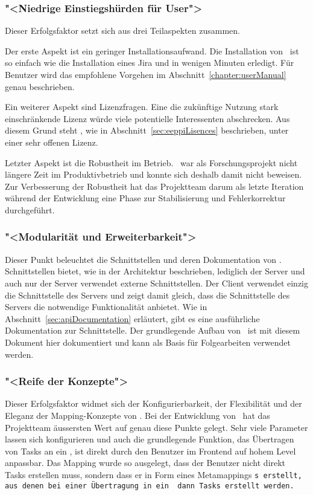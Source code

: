 		
		\subsubsection{"<Niedrige Einstiegshürden für User">}
			Dieser Erfolgsfaktor setzt sich aus drei Teilaspekten zusammen.
			
			Der erste Aspekt ist ein geringer Installationsaufwand.
			Die Installation von \eeppi\ ist so einfach wie  die Installation eines Jira und in wenigen Minuten erledigt. 
			Für Benutzer wird das empfohlene Vorgehen im Abschnitt~\ref{chapter:userManual} genau beschrieben.
			
			Ein weiterer Aspekt sind Lizenzfragen.
			Eine die zukünftige Nutzung stark einschränkende Lizenz würde viele potentielle Interessenten abschrecken.
			Aus diesem Grund steht \eeppi, wie in Abschnitt~\ref{sec:eeppiLisences} beschrieben, unter einer sehr offenen Lizenz.
			
			Letzter Aspekt ist die Robustheit im Betrieb.
			\eeppi\ war als Forschungsprojekt nicht längere Zeit im Produktivbetrieb
			und konnte sich deshalb damit nicht beweisen.
			Zur Verbesserung der Robustheit hat das Projektteam darum als letzte Iteration während der Entwicklung eine Phase zur Stabilisierung und Fehlerkorrektur durchgeführt.
		
		
		\subsubsection{"<Modularität und Erweiterbarkeit">}
			Dieser Punkt beleuchtet die Schnittstellen und deren Dokumentation von \eeppi.
			Schnittstellen bietet, wie in der Architektur beschrieben, lediglich der Server
			und auch nur der Server verwendet externe Schnittstellen.
			Der Client verwendet einzig die Schnittstelle des Servers
			und zeigt damit gleich, dass die Schnittstelle des Servers die notwendige Funktionalität anbietet.
			Wie in Abschnitt~\ref{sec:apiDocumentation} erläutert, gibt es eine ausführliche Dokumentation zur Schnittstelle.
			Der grundlegende Aufbau von \eeppi\ ist mit diesem Dokument hier dokumentiert
			und kann als Basis für Folgearbeiten verwendet werden.
			
			
		\subsubsection{"<Reife der Konzepte">}
			Dieser Erfolgsfaktor widmet sich der Konfigurierbarkeit, der Flexibilität und der Eleganz der Mapping-Konzepte von \eeppi.
			Bei der Entwicklung von \eeppi\ hat das Projektteam äussersten Wert auf genau diese Punkte gelegt.
			Sehr viele Parameter lassen sich konfigurieren und auch die grundlegende Funktion,
			das Übertragen von Tasks an ein \ppt, ist direkt durch den Benutzer im Frontend auf hohem Level anpassbar.
			Das Mapping wurde so ausgelegt, dass der Benutzer nicht direkt Tasks erstellen muss,
			sondern dass er in Form eines Metamappings \tt s erstellt,
			aus denen bei einer Übertragung in ein \ppt\ dann Tasks erstellt werden.
			
